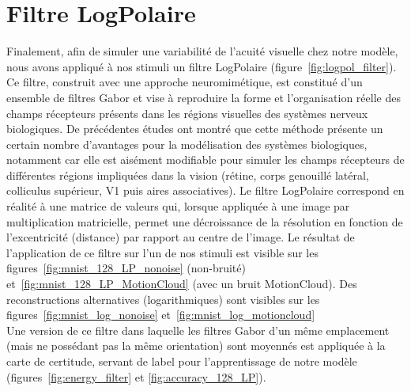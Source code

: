 \section{Filtre LogPolaire}
Finalement, afin de simuler une variabilité de l'acuité visuelle chez notre modèle, nous avons appliqué à nos stimuli un filtre LogPolaire (figure~\ref{fig:logpol_filter}).
Ce filtre, construit avec une approche neuromimétique, est constitué d'un ensemble de filtres Gabor et vise à reproduire la forme et l'organisation réelle des champs récepteurs présents dans les régions visuelles des systèmes nerveux biologiques. 
De précédentes études ont montré que cette méthode présente un certain nombre d'avantages pour la modélisation des systèmes biologiques, notamment car elle est aisément modifiable pour simuler les champs récepteurs de différentes régions impliquées dans la vision (rétine, corps genouillé latéral, colliculus supérieur, V1 puis aires associatives).
Le filtre LogPolaire correspond en réalité à une matrice de valeurs qui, lorsque appliquée à une image par multiplication matricielle, permet une décroissance de la résolution en fonction de l'excentricité (distance) par rapport au centre de l'image. 
Le résultat de l'application de ce filtre sur l'un de nos stimuli est visible sur les figures~\ref{fig:mnist_128_LP_nonoise} (non-bruité) et~\ref{fig:mnist_128_LP_MotionCloud} (avec un bruit MotionCloud). Des reconstructions alternatives (logarithmiques) sont visibles sur les figures~\ref{fig:mnist_log_nonoise} et~\ref{fig:mnist_log_motioncloud} \autocite{Freeman2011} \\
Une version de ce filtre dans laquelle les filtres Gabor d'un même emplacement (mais ne possédant pas la même orientation) sont moyennés est appliquée à la carte de certitude, servant de label pour l'apprentissage de notre modèle (figures~\ref{fig:energy_filter} et \ref{fig:accuracy_128_LP}).

